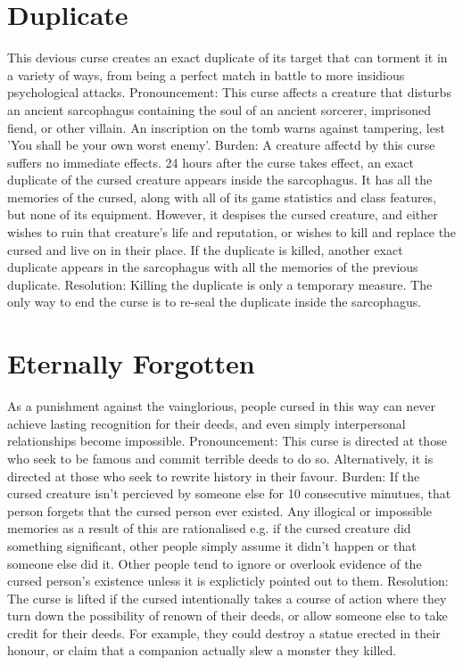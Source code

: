\documentclass[10pt,a4paper,twoside,twocolumn,openany,bg=print,nodeprecatedcode]{dndbook}
\begin{document}
\section{Duplicate}
This devious curse creates an exact duplicate of its target that can torment it in a variety of ways, from being a perfect match in battle to more insidious psychological attacks.
Pronouncement: This curse affects a creature that disturbs an ancient sarcophagus containing the soul of an ancient sorcerer, imprisoned fiend, or other villain. An inscription on the tomb warns against tampering, lest 'You shall be your own worst enemy'.
Burden: A creature affectd by this curse suffers no immediate effects. 24 hours after the curse takes effect, an exact duplicate of the cursed creature appears inside the sarcophagus. It has all the memories of the cursed, along with all of its game statistics and class features, but none of its equipment. However, it despises the cursed creature, and either wishes to ruin that creature's life and reputation, or wishes to kill and replace the cursed and live on in their place. If the duplicate is killed, another exact duplicate appears in the sarcophagus with all the memories of the previous duplicate.
Resolution: Killing the duplicate is only a temporary measure. The only way to end the curse is to re-seal the duplicate inside the sarcophagus.
\section{Eternally Forgotten}
As a punishment against the vainglorious, people cursed in this way can never achieve lasting recognition for their deeds, and even simply interpersonal relationships become impossible.
Pronouncement: This curse is directed at those who seek to be famous and commit terrible deeds to do so. Alternatively, it is directed at those who seek to rewrite history in their favour.
Burden: If the cursed creature isn't percieved by someone else for 10 consecutive minutues, that person forgets that the cursed person ever existed. Any illogical or impossible memories as a result of this are rationalised e.g. if the cursed creature did something significant, other people simply assume it didn't happen or that someone else did it. Other people tend to ignore or overlook evidence of the cursed person's existence unless it is explicticly pointed out to them.
Resolution: The curse is lifted if the cursed intentionally takes a course of action where they turn down the possibility of renown of their deeds, or allow someone else to take credit for their deeds. For example, they could destroy a statue erected in their honour, or claim that a companion actually slew a monster they killed.
\end{document}

